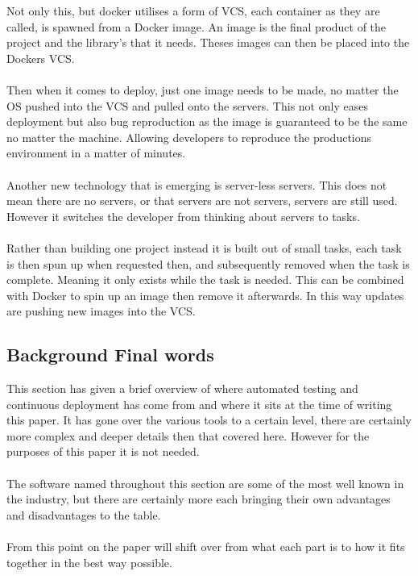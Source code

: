 Not only this, but docker utilises a form of VCS, each container as they are called, is spawned from a Docker image. An image is the final product of the project and the library's that it needs. Theses images can then be placed into the Dockers VCS.
\\\\
Then when it comes to deploy, just one image needs to be made, no matter the OS pushed into the VCS and pulled onto the servers. This not only eases deployment but also bug reproduction as the image is guaranteed to be the same no matter the machine. Allowing developers to reproduce the productions environment in a matter of minutes. 
\\\\
Another new technology that is emerging is server-less servers. This does not mean there are no servers, or that servers are not servers, servers are still used. However it switches the developer from thinking about servers to tasks.
\\\\
Rather than building one project instead it is built out of small tasks, each task is then spun up when requested then, and subsequently removed when the task is complete. Meaning it only exists while the task is needed. This can be combined with Docker to spin up an image then remove it afterwards. In this way updates are pushing new images into the VCS.

\subsection{Background Final words}

This section has given a brief overview of where automated testing and continuous deployment has come from and where it sits at the time of writing this paper. It has gone over the various tools to a certain level, there are certainly more complex and deeper details then that covered here. However for the purposes of this paper it is not needed.
\\\\
The software named throughout this section are some of the most well known in the industry, but there are certainly more each bringing their own advantages and disadvantages to the table.
\\\\
From this point on the paper will shift over from what each part is to how it fits together in the best way possible.